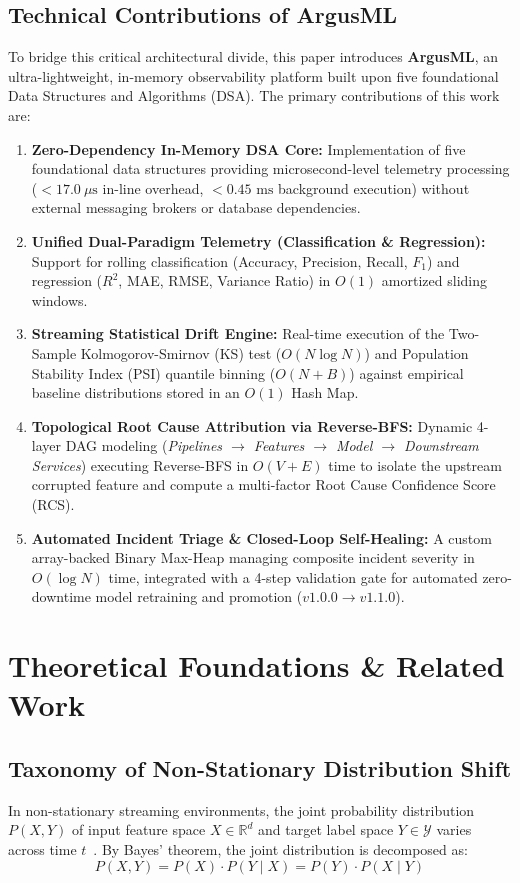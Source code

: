 \documentclass[conference]{IEEEtran}
\begin{document}
\subsection{Technical Contributions of ArgusML}
To bridge this critical architectural divide, this paper introduces \textbf{ArgusML}, an ultra-lightweight, in-memory observability platform built upon five foundational Data Structures and Algorithms (DSA). The primary contributions of this work are:
\begin{enumerate}
    \item \textbf{Zero-Dependency In-Memory DSA Core:} Implementation of five foundational data structures providing microsecond-level telemetry processing ($<17.0\ \mu\text{s}$ in-line overhead, $<0.45\text{ ms}$ background execution) without external messaging brokers or database dependencies.
    \item \textbf{Unified Dual-Paradigm Telemetry (Classification \& Regression):} Support for rolling classification (Accuracy, Precision, Recall, $F_1$) and regression ($R^2$, MAE, RMSE, Variance Ratio) in $O(1)$ amortized sliding windows.
    \item \textbf{Streaming Statistical Drift Engine:} Real-time execution of the Two-Sample Kolmogorov-Smirnov (KS) test ($O(N \log N)$) and Population Stability Index (PSI) quantile binning ($O(N+B)$) against empirical baseline distributions stored in an $O(1)$ Hash Map.
    \item \textbf{Topological Root Cause Attribution via Reverse-BFS:} Dynamic 4-layer DAG modeling (\textit{Pipelines $\to$ Features $\to$ Model $\to$ Downstream Services}) executing Reverse-BFS in $O(V+E)$ time to isolate the upstream corrupted feature and compute a multi-factor Root Cause Confidence Score (RCS).
    \item \textbf{Automated Incident Triage \& Closed-Loop Self-Healing:} A custom array-backed Binary Max-Heap managing composite incident severity in $O(\log N)$ time, integrated with a 4-step validation gate for automated zero-downtime model retraining and promotion ($v1.0.0 \to v1.1.0$).
\end{enumerate}

\section{Theoretical Foundations \& Related Work}

\subsection{Taxonomy of Non-Stationary Distribution Shift}
In non-stationary streaming environments, the joint probability distribution $P(X, Y)$ of input feature space $X \in \mathbb{R}^d$ and target label space $Y \in \mathcal{Y}$ varies across time $t$~\cite{gama2014, shimodaira2000}. By Bayes' theorem, the joint distribution is decomposed as:
\begin{equation}
P(X, Y) = P(X) \cdot P(Y \mid X) = P(Y) \cdot P(X \mid Y)
\end{equation}
\end{document}
